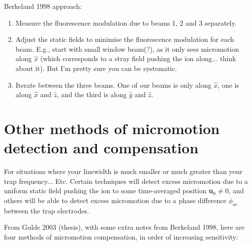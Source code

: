 \documentclass{article}
\begin{document}
Berkeland 1998 approach:

\begin{enumerate}
\item Measure the fluorescence modulation due to beams 1, 2 and 3 separately.
\item Adjust the static fields to minimise the fluorescence modulation for each beam. E.g., start with small window beam(?), as it only sees micromotion along $\hat{x}$ (which corresponds to a stray field pushing the ion along... think about it). But I'm pretty sure you can be systematic.
\item Iterate between the three beams. One of our beams is only along $\hat{x}$, one is along $\hat{x}$ and $\hat{z}$, and the third is along $\hat{y}$ and $\hat{z}$. 
\end{enumerate}



\section{Other methods of micromotion detection and compensation}

For situations where your linewidth is much smaller or much greater than your trap frequency... Etc. Certain techniques will detect excess micromotion due to a uniform static field pushing the ion to some time-averaged position \textbf{u}$_0 \neq 0$, and others will be able to detect excess micromotion due to a phase difference $\phi_{ac}$ between the trap electrodes. 

From Gulde 2003 (thesis), with some extra notes from Berkeland 1998, here are four methods of micromotion compensation, in order of increasing sensitivity:
\end{document}
